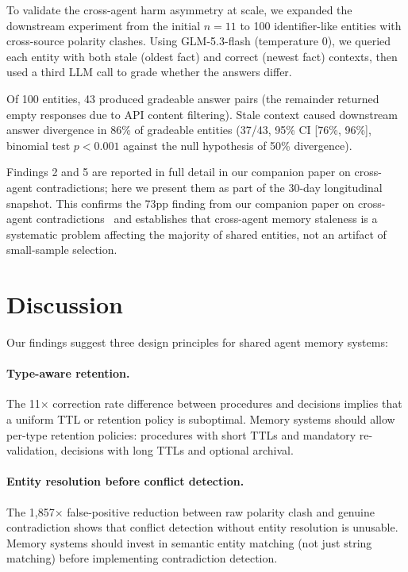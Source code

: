 \documentclass[11pt]{article}
\begin{document}
To validate the cross-agent harm asymmetry at scale, we expanded the downstream experiment from the initial $n{=}11$ to 100 identifier-like entities with cross-source polarity clashes. Using GLM-5.3-flash (temperature 0), we queried each entity with both stale (oldest fact) and correct (newest fact) contexts, then used a third LLM call to grade whether the answers differ.

Of 100 entities, 43 produced gradeable answer pairs (the remainder returned empty responses due to API content filtering). Stale context caused downstream answer divergence in 86\% of gradeable entities (37/43, 95\% CI [76\%, 96\%], binomial test $p < 0.001$ against the null hypothesis of 50\% divergence).

Findings 2 and 5 are reported in full detail in our companion paper on cross-agent contradictions; here we present them as part of the 30-day longitudinal snapshot. This confirms the 73pp finding from our companion paper on cross-agent contradictions~\cite{cac} and establishes that cross-agent memory staleness is a systematic problem affecting the majority of shared entities, not an artifact of small-sample selection.
\section{Discussion}
\label{sec:discussion}

Our findings suggest three design principles for shared agent memory systems:

\paragraph{Type-aware retention.} The 11$\times$ correction rate difference between procedures and decisions implies that a uniform TTL or retention policy is suboptimal. Memory systems should allow per-type retention policies: procedures with short TTLs and mandatory re-validation, decisions with long TTLs and optional archival.

\paragraph{Entity resolution before conflict detection.} The 1,857$\times$ false-positive reduction between raw polarity clash and genuine contradiction shows that conflict detection without entity resolution is unusable. Memory systems should invest in semantic entity matching (not just string matching) before implementing contradiction detection.
\end{document}
